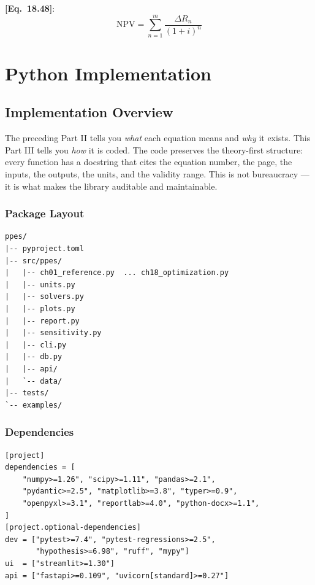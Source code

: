 \documentclass[11pt,a4paper,openany]{book}
\newcommand{\eqrefbook}[1]{\textcolor{blue!60!black}{\textbf{[Eq.~#1]}}}
\begin{document}
\eqrefbook{18.48}:
\begin{equation}
  \text{NPV} = \sum_{n=1}^m \frac{\Delta R_n}{(1+i)^n}
\end{equation}

\part{Python Implementation}

\chapter{Implementation Overview}

\begin{purpose}
The preceding Part II tells you \emph{what} each equation means and
\emph{why} it exists. This Part III tells you \emph{how} it is coded.
The code preserves the theory-first structure: every function has a
docstring that cites the equation number, the page, the inputs, the
outputs, the units, and the validity range. This is not bureaucracy —
it is what makes the library auditable and maintainable.
\end{purpose}

\section{Package Layout}

\begin{lstlisting}[style=bash]
ppes/
|-- pyproject.toml
|-- src/ppes/
|   |-- ch01_reference.py  ... ch18_optimization.py
|   |-- units.py
|   |-- solvers.py
|   |-- plots.py
|   |-- report.py
|   |-- sensitivity.py
|   |-- cli.py
|   |-- db.py
|   |-- api/
|   `-- data/
|-- tests/
`-- examples/
\end{lstlisting}

\section{Dependencies}

\begin{lstlisting}[style=latex]
[project]
dependencies = [
    "numpy>=1.26", "scipy>=1.11", "pandas>=2.1",
    "pydantic>=2.5", "matplotlib>=3.8", "typer>=0.9",
    "openpyxl>=3.1", "reportlab>=4.0", "python-docx>=1.1",
]
[project.optional-dependencies]
dev = ["pytest>=7.4", "pytest-regressions>=2.5",
       "hypothesis>=6.98", "ruff", "mypy"]
ui  = ["streamlit>=1.30"]
api = ["fastapi>=0.109", "uvicorn[standard]>=0.27"]
\end{lstlisting}
\end{document}
